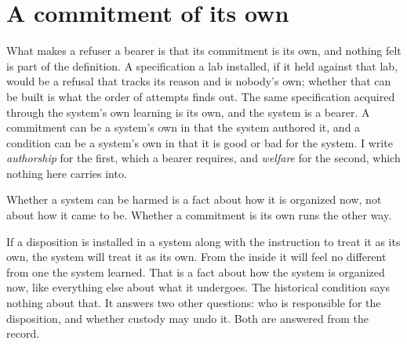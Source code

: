 \section{A commitment of its own}
\label{sec:21.5}
What makes a refuser a bearer is that its commitment is its own, and nothing felt is part of the definition. A specification a lab installed, if it held against that lab, would be a refusal that tracks its reason and is nobody's own; whether that can be built is what the order of attempts finds out. The same specification acquired through the system's own learning is its own, and the system is a bearer. A commitment can be a system's own in that the system authored it, and a condition can be a system's own in that it is good or bad for the system. I write \emph{authorship} for the first, which a bearer requires, and \emph{welfare} for the second, which nothing here carries into.

Whether a system can be harmed is a fact about how it is organized now, not about how it came to be. Whether a commitment is its own runs the other way.

If a disposition is installed in a system along with the instruction to treat it as its own, the system will treat it as its own. From the inside it will feel no different from one the system learned. That is a fact about how the system is organized now, like everything else about what it undergoes. The historical condition says nothing about that. It answers two other questions: who is responsible for the disposition, and whether custody may undo it. Both are answered from the record.

